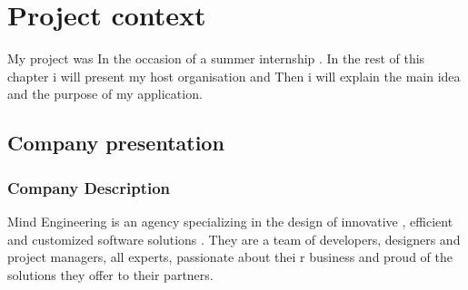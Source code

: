 \chapter{Project context}
My project was In the occasion of a summer internship . In the rest of this chapter i will present my host organisation and Then i will explain the main idea and the purpose of my application.  
\section{Company presentation}
\subsection{Company Description}
Mind Engineering is an agency specializing in the design of innovative , efficient and customized software solutions . They are a team of developers, designers and project managers, all experts, passionate about thei	r business and proud of the solutions they offer to their partners.
